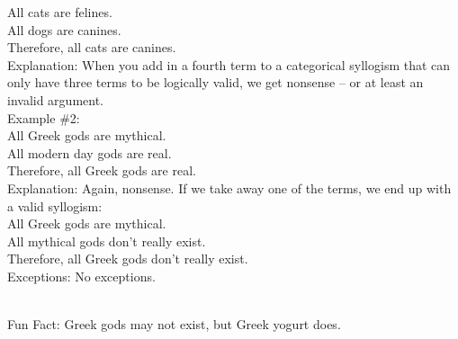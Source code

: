 \documentclass[a4paper,12pt,single,pdftex]{scrartcl}
\begin{document}
    
      All cats are felines.
    \\

    
      All dogs are canines.
    \\

    
      Therefore, all cats are canines.
    \\

    
      Explanation: When you add in a fourth term to a categorical syllogism that can only have three terms to be logically valid, we get nonsense -- or at least an invalid argument. 
    \\

    
      Example \#2:
    \\

    
      All Greek gods are mythical.
    \\

    
      All modern day gods are real.
    \\

    
      Therefore, all Greek gods are real.
    \\

    
      Explanation: Again, nonsense.  If we take away one of the terms, we end up with a valid syllogism:
    \\

    
      All Greek gods are mythical.
    \\

    
      All mythical gods don’t really exist.
    \\

    
      Therefore, all Greek gods don’t really exist.
    \\

    
      Exceptions: No exceptions. \newline

    \\

    
      Fun Fact: Greek gods may not exist, but Greek yogurt does.
    \\
\end{document}
